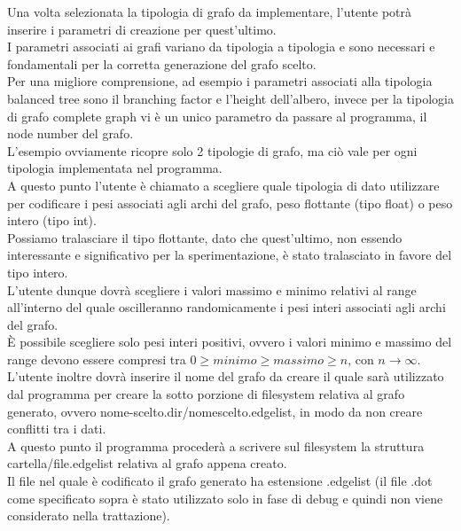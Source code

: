 Una volta selezionata la tipologia di grafo da implementare, l'utente potrà inserire i parametri di creazione per quest'ultimo.\\
I parametri associati ai grafi variano da tipologia a tipologia e sono necessari e fondamentali per la corretta generazione del grafo scelto.\\

Per una migliore comprensione, ad esempio i parametri associati alla tipologia balanced tree sono il branching factor e l'height dell'albero, invece per la tipologia di grafo complete graph vi è un unico parametro da passare al programma, il node number del grafo.\\
L'esempio ovviamente ricopre solo 2 tipologie di grafo, ma ciò vale per ogni tipologia implementata nel programma.\\

A questo punto l'utente è chiamato a scegliere quale tipologia di dato utilizzare per codificare i pesi associati agli archi del grafo, peso flottante (tipo float) o peso intero (tipo int).\\
Possiamo tralasciare il tipo flottante, dato che quest'ultimo, non essendo interessante e significativo per la sperimentazione, è stato tralasciato in favore del tipo intero.\\

L'utente dunque dovrà scegliere i valori massimo e minimo relativi al range all'interno del quale oscilleranno randomicamente i pesi interi associati agli archi del grafo.\\
È possibile scegliere solo pesi interi positivi, ovvero i valori minimo e massimo del range devono essere compresi tra \(0 \geq minimo \geq massimo \geq n\), con \(n\to\infty\).\\

L'utente inoltre dovrà inserire il nome del grafo da creare il quale sarà utilizzato dal programma per creare la sotto porzione di filesystem relativa al grafo generato, ovvero nome-scelto.dir/nomescelto.edgelist, in modo da non creare conflitti tra i dati.\\

A questo punto il programma procederà a scrivere sul filesystem la struttura cartella/file.edgelist relativa al grafo appena creato.\\

Il file nel quale è codificato il grafo generato ha estensione .edgelist (il file .dot come specificato sopra è stato utilizzato solo in fase di debug e quindi non viene considerato nella trattazione).\\

